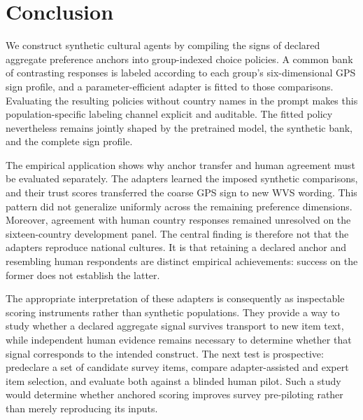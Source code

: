 \section{Conclusion}\label{sec:conclusion}

We construct synthetic cultural agents by compiling the signs of declared aggregate preference anchors into group-indexed choice policies. A common bank of contrasting responses is labeled according to each group's six-dimensional GPS sign profile, and a parameter-efficient adapter is fitted to those comparisons. Evaluating the resulting policies without country names in the prompt makes this population-specific labeling channel explicit and auditable. The fitted policy nevertheless remains jointly shaped by the pretrained model, the synthetic bank, and the complete sign profile.

The empirical application shows why anchor transfer and human agreement must be evaluated separately. The adapters learned the imposed synthetic comparisons, and their trust scores transferred the coarse GPS sign to new WVS wording. This pattern did not generalize uniformly across the remaining preference dimensions. Moreover, agreement with human country responses remained unresolved on the sixteen-country development panel. The central finding is therefore not that the adapters reproduce national cultures. It is that retaining a declared anchor and resembling human respondents are distinct empirical achievements: success on the former does not establish the latter.

The appropriate interpretation of these adapters is consequently as inspectable scoring instruments rather than synthetic populations. They provide a way to study whether a declared aggregate signal survives transport to new item text, while independent human evidence remains necessary to determine whether that signal corresponds to the intended construct. The next test is prospective: predeclare a set of candidate survey items, compare adapter-assisted and expert item selection, and evaluate both against a blinded human pilot. Such a study would determine whether anchored scoring improves survey pre-piloting rather than merely reproducing its inputs.
